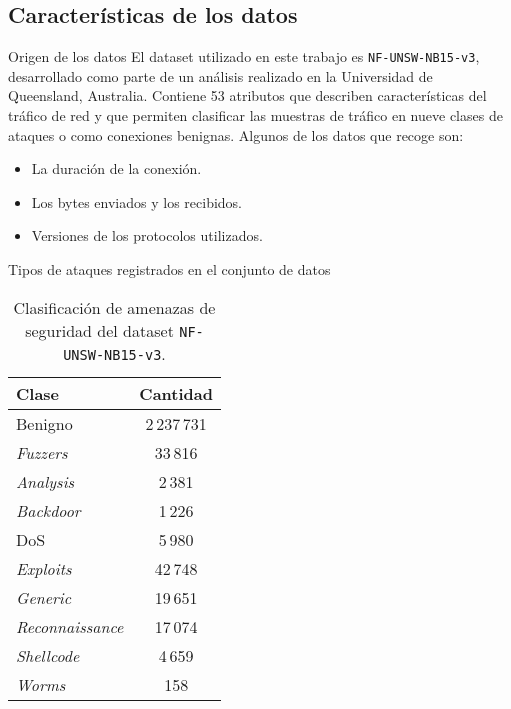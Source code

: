 \subsection{Características de los datos}
\begin{frame}{Origen de los datos}
El dataset utilizado en este trabajo es \texttt{NF-UNSW-NB15-v3}, desarrollado como parte de un análisis realizado en la Universidad de Queensland, Australia.
Contiene 53 atributos que describen características del tráfico de red y que permiten clasificar las muestras de tráfico en nueve clases de ataques o como conexiones benignas. Algunos de los datos que recoge son:
\begin{itemize}
	\item La duración de la conexión.
	\item Los bytes enviados y los recibidos.
	\item Versiones de los protocolos utilizados.
\end{itemize}
\end{frame}

\begin{frame}{Tipos de ataques registrados en el conjunto de datos}

\begin{table}[H]
\centering
\begin{tabular}{|l|c|} 
\hline
\rowcolor[HTML]{f0f7ff}  
\textbf{Clase} & \textbf{Cantidad} \\ \hline
Benigno & 2\,237\,731 \\ \hline
\textit{Fuzzers} & 33\,816 \\ \hline
\textit{Analysis} & 2\,381 \\ \hline
\textit{Backdoor} & 1\,226 \\ \hline
DoS & 5\,980 \\ \hline
\textit{Exploits} & 42\,748 \\ \hline
\textit{Generic} & 19\,651 \\ \hline
\textit{Reconnaissance} & 17\,074 \\ \hline
\textit{Shellcode} & 4\,659 \\ \hline
\textit{Worms} & 158 \\ \hline
\end{tabular}
\caption{Clasificación de amenazas de seguridad del dataset \texttt{NF-UNSW-NB15-v3}.}
\label{tab:attacks-tab}
\end{table}

\end{frame}

